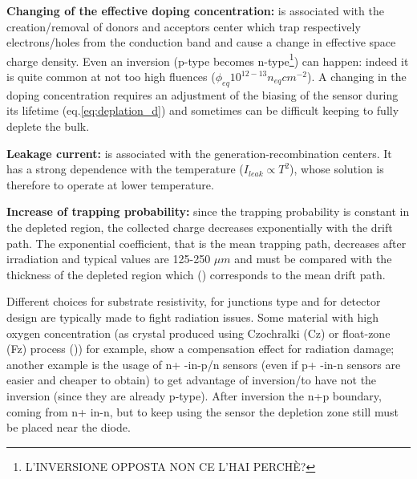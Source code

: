    \textbf{Changing of the effective doping concentration:} is associated with the creation/removal of donors and acceptors center which trap respectively electrons/holes from the conduction band and cause a change in effective space charge density. Even an inversion (p-type becomes n-type\footnote{L'INVERSIONE OPPOSTA NON CE L'HAI PERCHÈ?}) can happen: indeed it is quite common at not too high fluences ($\phi_{eq} 10^{12-13}n_{eq}cm^{-2}$). 
    A changing in the doping concentration requires an adjustment of the biasing of the sensor during its lifetime (eq.\ref{eq:deplation_d}) and sometimes can be difficult keeping to fully deplete the bulk.

    \textbf{Leakage current:} is associated with the generation-recombination centers. It has a strong dependence with the temperature ($I_{leak}\propto T^2$), whose solution is therefore to operate at lower temperature.

    \textbf{Increase of trapping probability:} since the trapping probability is constant in the depleted region, the collected charge decreases exponentially with the drift path. The exponential coefficient, that is the mean trapping path, decreases after irradiation and typical values are 125-250 $\mu m$ and must be compared with the thickness of the depleted region which () corresponds to the mean drift path.

    Different choices for substrate resistivity, for junctions type and for detector design are typically made to fight radiation issues. Some material with high oxygen concentration (as crystal produced using Czochralki (Cz) or float-zone (Fz) process ()) for example, show a compensation effect for radiation damage; another example is the usage of n+ -in-p/n sensors (even if p+ -in-n sensors are easier and cheaper to obtain) to get advantage of inversion/to have not the inversion (since they are already p-type). After inversion the n+p boundary, coming from n+ in-n, but to keep using the sensor the depletion zone still must be placed near the diode.
    
    